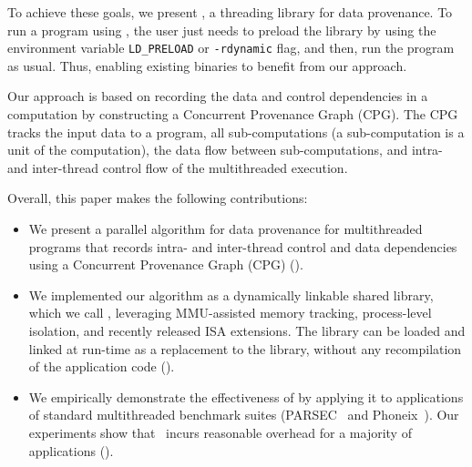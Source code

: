To achieve these goals, we present \projecttitle, a threading library for data provenance. To run a program using \projecttitle,  the user just needs to preload the \projecttitle library  by using the environment variable {\tt LD\_PRELOAD} or {\tt -rdynamic} flag, and then, run the program as usual. Thus, enabling existing binaries to benefit from our approach. 


Our approach is based on recording the data and control dependencies in a computation by constructing a Concurrent Provenance Graph (CPG). The CPG tracks the input data to a program, all sub-computations (a sub-computation is a unit of the computation), the data flow between sub-computations, and intra- and inter-thread control flow of the multithreaded execution.


Overall, this paper makes the following contributions:
\begin{itemize}

\item We present a parallel algorithm for data provenance for multithreaded programs that records intra- and inter-thread control and data dependencies using a Concurrent Provenance Graph (CPG) ().

\item We implemented our algorithm as a dynamically linkable shared library, which we call \projecttitle, leveraging MMU-assisted memory tracking, process-level isolation, and recently released \intelpt ISA extensions.  The \projecttitle library can be loaded and linked at run-time as a replacement to the \pthreads library, without any recompilation  of the application code ().

\item  We  empirically demonstrate  the effectiveness of \projecttitle by applying it to applications of standard multithreaded benchmark suites (PARSEC~\cite{parsec} and Phoneix~\cite{phoenix}). Our experiments show that \projecttitle~incurs reasonable overhead for a majority of applications (). 

\end{itemize}


